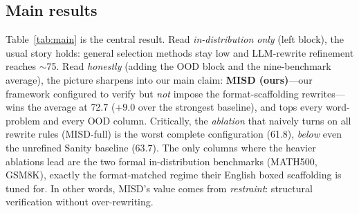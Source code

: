 \documentclass[letterpaper]{article} %
\newcommand{\good}[1]{\textcolor{misdgreen}{#1}}
\newcommand{\bad}[1]{\textcolor{misdred}{#1}}
\begin{document}
\subsection{Main results}
Table~\ref{tab:main} is the central result. Read \emph{in-distribution only} (left block), the usual story holds: general selection methods stay low and LLM-rewrite refinement reaches $\sim$75. Read \emph{honestly} (adding the OOD block and the nine-benchmark average), the picture sharpens into our main claim: \good{\textbf{MISD (ours)}}---our framework configured to verify but \emph{not} impose the format-scaffolding rewrites---wins the average at \good{72.7} ($+9.0$ over the strongest baseline), and tops every word-problem and every OOD column. Critically, the \emph{ablation} that naively turns on all rewrite rules (\bad{MISD-full}) is the \bad{worst} complete configuration (61.8), \emph{below} even the unrefined Sanity baseline (63.7). The only columns where the heavier ablations lead are the two formal in-distribution benchmarks (MATH500, GSM8K), exactly the format-matched regime their English boxed scaffolding is tuned for. In other words, MISD's value comes from \emph{restraint}: structural verification without over-rewriting.
\end{document}
